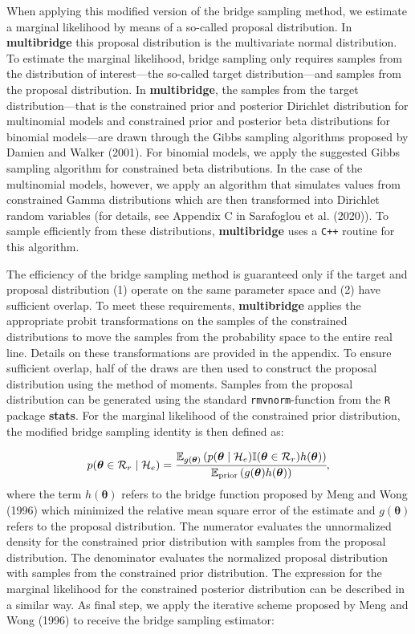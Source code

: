 \documentclass[
  english,
  man,floatsintext]{apa6}
\begin{document}
When applying this modified version of the bridge sampling method, we estimate a marginal likelihood by means of a so-called proposal distribution. In \textbf{multibridge} this proposal distribution is the multivariate normal distribution. To estimate the marginal likelihood, bridge sampling only requires samples from the distribution of interest---the so-called target distribution---and samples from the proposal distribution. In \textbf{multibridge}, the samples from the target distribution---that is the constrained prior and posterior Dirichlet distribution for multinomial models and constrained prior and posterior beta distributions for binomial models---are drawn through the Gibbs sampling algorithms proposed by Damien and Walker (2001). For binomial models, we apply the suggested Gibbs sampling algorithm for constrained beta distributions. In the case of the multinomial models, however, we apply an algorithm that simulates values from constrained Gamma distributions which are then transformed into Dirichlet random variables (for details, see Appendix C in Sarafoglou et al. (2020)). To sample efficiently from these distributions, \textbf{multibridge} uses a \texttt{C++} routine for this algorithm.

The efficiency of the bridge sampling method is guaranteed only if the target and proposal distribution (1) operate on the same parameter space and (2) have sufficient overlap. To meet these requirements, \textbf{multibridge} applies the appropriate probit transformations on the samples of the constrained distributions to move the samples from the probability space to the entire real line. Details on these transformations are provided in the appendix. To ensure sufficient overlap, half of the draws are then used to construct the proposal distribution using the method of moments. Samples from the proposal distribution can be generated using the standard \texttt{rmvnorm}-function from the \texttt{R} package \textbf{stats}. For the marginal likelihood of the constrained prior distribution, the modified bridge sampling identity is then defined as:

\begin{align}
    p(\boldsymbol{\theta} \in \mathcal{R}_r \mid \mathcal{H}_e) = \cfrac{\mathbb{E}_{g(\boldsymbol{\theta})}\left(p(\boldsymbol{\theta}\mid \mathcal{H}_e) \mathbb{I}(\boldsymbol{\theta}\in\mathcal{R}_r)h(\boldsymbol{\theta})\right)}{\mathbb{E}_{\text{prior}} \left(g(\boldsymbol{\theta})h(\boldsymbol{\theta})\right)},
    \label{Eq:bridgeidentity}
\end{align}
where the term \(h(\boldsymbol{\theta})\) refers to the bridge function proposed by Meng and Wong (1996) which minimized the relative mean square error of the estimate and \(g(\boldsymbol{\theta})\) refers to the proposal distribution. The numerator evaluates the unnormalized density for the constrained prior distribution with samples from the proposal distribution. The denominator evaluates the normalized proposal distribution with samples from the constrained prior distribution. The expression for the marginal likelihood for the constrained posterior distribution can be described in a similar way. As final step, we apply the iterative scheme proposed by Meng and Wong (1996) to receive the bridge sampling estimator:
\end{document}
